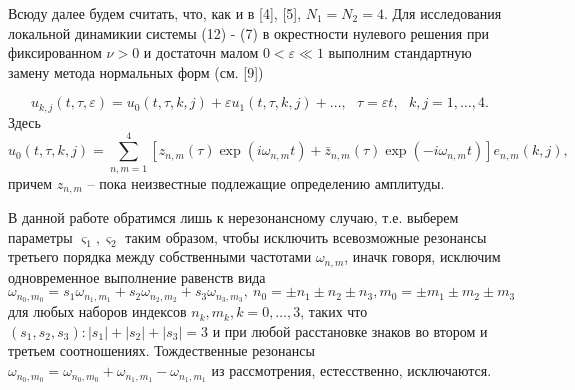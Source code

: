 \documentclass[12pt]{article}  %
\begin{document}
         

Всюду далее будем считать, что, как и в [4], [5], $N_1 = N_2 = 4$. 
Для исследования локальной динамикии системы (12) \-- (7) в окрестности нулевого решения при фиксированном $\nu > 0$ и достаточн малом $0 < \varepsilon \ll 1$ выполним стандартную замену метода нормальных форм (см. [9])

\begin{equation}
u_{k,j}(t,\tau,\varepsilon) = u_0(t,\tau,k,j) + \varepsilon u_1(t,\tau,k,j) + \dots,\ \ \ \tau = \varepsilon t, \ \ \ k,j = 1,\dots,4.
\end{equation}
Здесь
\begin{equation}
u_0(t,\tau,k,j) = \sum_{n,m=1}^{4}\left[z_{n,m}(\tau)\exp(i\omega_{n,m}t)+\bar{z}_{n,m}(\tau)\exp(-i\omega_{n,m}t)\right]e_{n,m}(k,j),
\end{equation}
причем $z_{n,m}$ \--- пока неизвестные подлежащие определению амплитуды.
 
В данной работе обратимся лишь к нерезонансному случаю, т.е. выберем параметры $\varsigma_1, \varsigma_2$ таким образом, чтобы исключить всевозможные резонансы третьего порядка между собственными частотами $\omega_{n,m}$, иначк говоря, исключим одновременное выполнение равенств вида $\omega_{n_0,m_0} = s_1\omega_{n_1,m_1} +  s_2\omega_{n_2,m_2} + s_3\omega_{n_3,m_3},\ n_0 = \pm n_1 \pm n_2 \pm n_3, m_0 = \pm m_1 \pm m_2 \pm m_3$ для любых наборов индексов  $n_k,m_k, k=0,\dots,3$, таких что $(s_1, s_2, s_3): |s_1|+|s_2|+|s_3| = 3$ и при любой расстановке знаков во втором и третьем соотношениях. Тождественные резонансы $\omega_{n_0,m_0}=\omega_{n_0,m_0}+\omega_{n_1,m_1}-\omega_{n_1,m_1}$ из рассмотрения, естесственно, исключаются.
\end{document}
